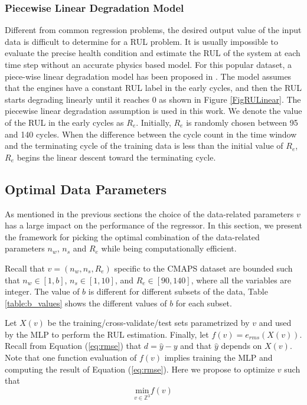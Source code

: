 \documentclass[12pt]{IEEEtran}%
\begin{document}
\subsubsection{Piecewise Linear Degradation Model}

Different from common regression problems, the desired output value of the
input data is difficult to determine for a RUL problem. It is usually
impossible to evaluate the precise health condition and estimate the RUL of
the system at each time step without an accurate physics based model. For this
popular dataset, a piece-wise linear degradation model has been proposed in
\cite{Ramasso2014}. The model assumes that the engines have a constant RUL
label in the early cycles, and then the RUL starts degrading linearly until it
reaches 0 as shown in Figure \ref{FigRULinear}. The piecewise linear
degradation assumption is used in this work. We denote the value of the RUL in
the early cycles as $R_{e}$. Initially,  $R_{e}$ is randomly chosen between 95 and 140 
cycles. When the difference between the cycle count in the time window and the terminating cycle 
of the training data is less than the initial value of $R_{e}$, $R_{e}$ begins the linear 
descent toward the terminating cycle.

\subsection{Optimal Data Parameters}

\label{sec:otimal_data_params}

As mentioned in the previous sections the choice of the data-related
parameters $v$ has a large impact on the performance of the regressor. In this
section, we present the framework for picking the optimal combination of the
data-related parameters $n_{w}$, $n_{s}$ and $R_{e}$ while being
computationally efficient.

Recall that $v = (n_{w}, n_{s}, R_{e})$ specific to the CMAPS dataset are
bounded such that $n_{w} \in\left[  1, b\right]  $, $n_{s} \in\left[  1,
10\right]  $, and $R_{e} \in\left[  90, 140 \right]  $, where all the
variables are integer. The value of $b$ is different for different subsets of
the data, Table \ref{table:b_values} shows the different values of $b$ for
each subset.

Let $X(v)$ be the training/cross-validate/test sets parametrized by $v$ and
used by the MLP to perform the RUL estimation. Finally, let $f(v)=e_{rms}%
(X(v))$. Recall from Equation (\ref{eq:rmse}) that $d = \hat{y} - y$ and that
$\hat{y}$ depends on $X(v)$. Note that one function evaluation of $f(v)$
implies training the MLP and computing the result of Equation (\ref{eq:rmse}).
Here we propose to optimize $v$ such that
\begin{equation}
\underset{v \in\mathbb{Z}^{3}}{\mathrm{min}} f(v)
\label{eq:optimization_problem}%
\end{equation}
\end{document}
